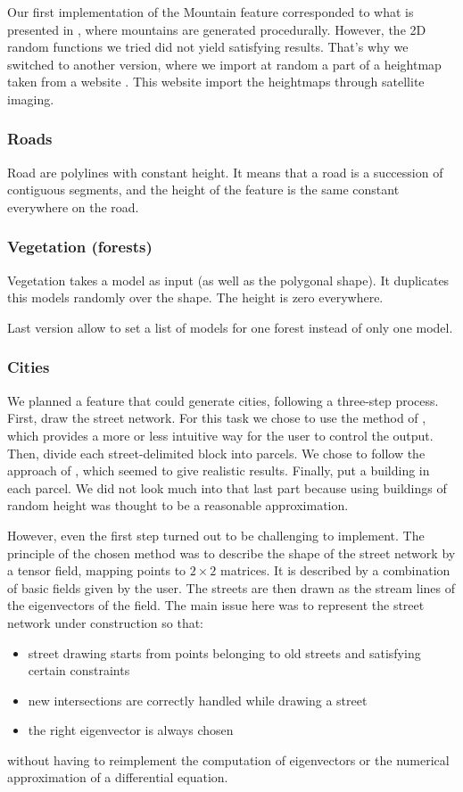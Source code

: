 Our first implementation of the Mountain feature corresponded to what
is presented in \cite{FeatureTree}, where mountains are generated
procedurally. However, the 2D random functions we tried did not yield
satisfying results. That's why we switched to another version, where
we import at random a part of a heightmap taken from a website
\cite{terrain-party}. This website import the heightmaps through
satellite imaging.

\subsubsection{Roads}
Road are polylines with constant height. It means that a road is a succession of contiguous segments, and the height of the feature is the same constant everywhere on the road. 


\subsubsection{Vegetation (forests)}
Vegetation takes a model as input (as well as the polygonal shape). It duplicates this models randomly over the shape. The height is zero everywhere.

Last version allow to set a list of models for one forest instead of only one model.


\subsubsection{Cities}

We planned a feature that could generate cities, following a
three-step process. First, draw the street network. For this task we
chose to use the method of \cite{StreetTensors}, which provides a more
or less intuitive way for the user to control the output. Then, divide
each street-delimited block into parcels. We chose to follow the
approach of \cite{PGParcels}, which seemed to give realistic
results. Finally, put a building in each parcel. We did not look much
into that last part because using buildings of random height was
thought to be a reasonable approximation.

However, even the first step turned out to be challenging to
implement. The principle of the chosen method was to describe the
shape of the street network by a tensor field, mapping points to $2
\times 2$ matrices. It is described by a combination of basic fields
given by the user. The streets are then drawn as the stream lines of
the eigenvectors of the field. The main issue here was to represent
the street network under construction so that:
\begin{itemize}
  \item street drawing starts from points belonging to old streets and
satisfying certain constraints
  \item new intersections are correctly handled while drawing a street
  \item the right eigenvector is always chosen
\end{itemize} without having to reimplement the computation of
eigenvectors or the numerical approximation of a differential
equation.


